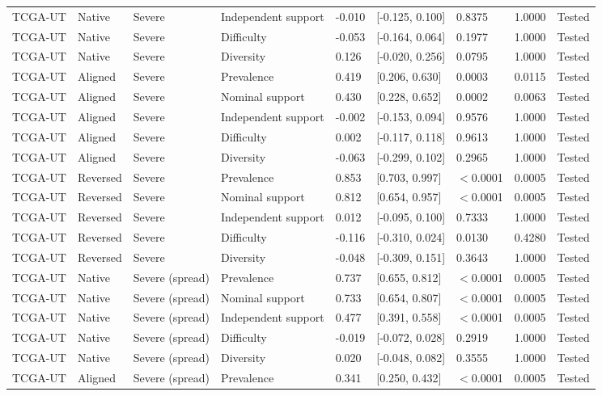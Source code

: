 \begin{longtable}{lllllllll}
TCGA-UT & Native & Severe & Independent support & -0.010 & [-0.125, 0.100] & 0.8375 & 1.0000 & Tested \\
TCGA-UT & Native & Severe & Difficulty & -0.053 & [-0.164, 0.064] & 0.1977 & 1.0000 & Tested \\
TCGA-UT & Native & Severe & Diversity & 0.126 & [-0.020, 0.256] & 0.0795 & 1.0000 & Tested \\
TCGA-UT & Aligned & Severe & Prevalence & 0.419 & [0.206, 0.630] & 0.0003 & 0.0115 & Tested \\
TCGA-UT & Aligned & Severe & Nominal support & 0.430 & [0.228, 0.652] & 0.0002 & 0.0063 & Tested \\
TCGA-UT & Aligned & Severe & Independent support & -0.002 & [-0.153, 0.094] & 0.9576 & 1.0000 & Tested \\
TCGA-UT & Aligned & Severe & Difficulty & 0.002 & [-0.117, 0.118] & 0.9613 & 1.0000 & Tested \\
TCGA-UT & Aligned & Severe & Diversity & -0.063 & [-0.299, 0.102] & 0.2965 & 1.0000 & Tested \\
TCGA-UT & Reversed & Severe & Prevalence & 0.853 & [0.703, 0.997] & $<$0.0001 & 0.0005 & Tested \\
TCGA-UT & Reversed & Severe & Nominal support & 0.812 & [0.654, 0.957] & $<$0.0001 & 0.0005 & Tested \\
TCGA-UT & Reversed & Severe & Independent support & 0.012 & [-0.095, 0.100] & 0.7333 & 1.0000 & Tested \\
TCGA-UT & Reversed & Severe & Difficulty & -0.116 & [-0.310, 0.024] & 0.0130 & 0.4280 & Tested \\
TCGA-UT & Reversed & Severe & Diversity & -0.048 & [-0.309, 0.151] & 0.3643 & 1.0000 & Tested \\
TCGA-UT & Native & Severe (spread) & Prevalence & 0.737 & [0.655, 0.812] & $<$0.0001 & 0.0005 & Tested \\
TCGA-UT & Native & Severe (spread) & Nominal support & 0.733 & [0.654, 0.807] & $<$0.0001 & 0.0005 & Tested \\
TCGA-UT & Native & Severe (spread) & Independent support & 0.477 & [0.391, 0.558] & $<$0.0001 & 0.0005 & Tested \\
TCGA-UT & Native & Severe (spread) & Difficulty & -0.019 & [-0.072, 0.028] & 0.2919 & 1.0000 & Tested \\
TCGA-UT & Native & Severe (spread) & Diversity & 0.020 & [-0.048, 0.082] & 0.3555 & 1.0000 & Tested \\
TCGA-UT & Aligned & Severe (spread) & Prevalence & 0.341 & [0.250, 0.432] & $<$0.0001 & 0.0005 & Tested \\

\end{longtable}
